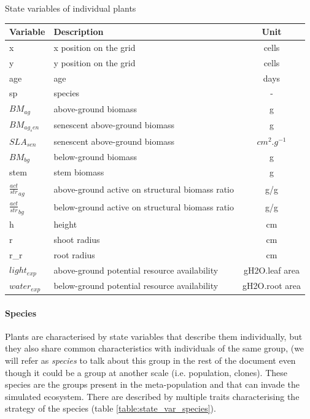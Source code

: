 \begin{table2*}
\caption{State variables of individual plants} 
\label{table:state_var_plant}
\begin{tabular}{l|l|c}
Variable & Description & Unit \\ 
\hline 
x & x position on the grid & cells \\
y & y position on the grid & cells \\
age & age & days \\
sp & species & - \\
$BM_{ag}$ & above-ground biomass & g \\
$BM_{ag_sen}$ & senescent above-ground biomass & g \\
$SLA_{sen}$ & senescent above-ground biomass & $cm^{2}.g^{-1}$ \\
$BM_{bg}$ & below-ground biomass & g \\
stem & stem biomass & g \\
$\frac{act}{str}_{ag}$ & above-ground active on structural biomass ratio & g/g \\
$\frac{act}{str}_{bg}$ & below-ground active on structural biomass ratio & g/g \\
h & height & cm \\
r & shoot radius & cm \\
r\_r & root radius & cm \\ 
$light_{exp}$ & above-ground potential resource availability & gH2O.leaf area\\
$water_{exp}$ & below-ground potential resource availability & gH2O.root area\\
\end{tabular} 
\vspace*{0.5cm}
\end{table2*}


\paragraph{Species} Plants are characterised by state variables that describe them individually, but they also share common characteristics with individuals of the same group, (we will refer as \textit{species} to talk about this group in the rest of the document even though it could be a group at another scale (i.e. population, clones). These species are the groups present in the meta-population and that can invade the simulated ecosystem. There are described by multiple traits characterising the strategy of the species (table \ref{table:state_var_species}).


